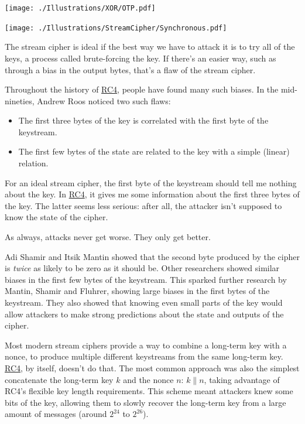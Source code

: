 \documentclass[11pt,ebook,table,dvipsnames]{memoir}
\begin{document}
\texttt{[image: ./Illustrations/XOR/OTP.pdf]}

\texttt{[image: ./Illustrations/StreamCipher/Synchronous.pdf]}

The stream cipher is ideal if the best way we have to attack it is to
try all of the keys, a process called brute-forcing the key. If
there's an easier way, such as through a bias in the output bytes,
that's a flaw of the stream cipher.

Throughout the history of \hyperref[RC4]{RC4}, people have found many such biases. In
the mid-nineties, Andrew Roos noticed two such flaws:

\begin{itemize}
\item The first three bytes of the key is correlated with the first byte
of the keystream.
\item The first few bytes of the state are related to the key with a
simple (linear) relation.
\end{itemize}

For an ideal stream cipher, the first byte of the keystream should
tell me nothing about the key. In \hyperref[RC4]{RC4}, it gives me some information
about the first three bytes of the key. The latter seems less serious:
after all, the attacker isn't supposed to know the state of the
cipher.

As always, attacks never get worse. They only get better.

Adi Shamir and Itsik Mantin showed that the second byte produced by
the cipher is \emph{twice} as likely to be zero as it should be. Other
researchers showed similar biases in the first few bytes of the
keystream. This sparked further research by Mantin, Shamir and
Fluhrer\cite{fms:rc4}, showing large biases in the first bytes of the
keystream. They also showed that knowing even small parts of the key
would allow attackers to make strong predictions about the state and
outputs of the cipher.

Most modern stream ciphers provide a way to combine a long-term key
with a \gls{nonce}, to produce multiple different keystreams from the
same long-term key. \hyperref[RC4]{RC4}, by itself, doesn't do that. The most common
approach was also the simplest concatenate the long-term key $k$ and
the nonce $n$: $k \| n$, taking advantage of RC4's flexible key length
requirements. This scheme meant attackers knew some bits of the key,
allowing them to slowly recover the long-term key from a large amount
of messages (around $2^{24}$ to $2^{26}$).
\end{document}
